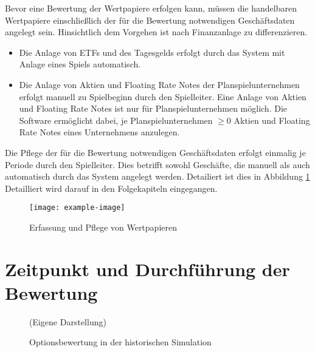 \documentclass[12pt, a4paper]{article}
\begin{document}
Bevor eine Bewertung der Wertpapiere erfolgen kann, müssen die handelbaren Wertpapiere einschließlich der für die Bewertung notwendigen Geschäftsdaten angelegt sein. Hinsichtlich dem Vorgehen ist nach Finanzanlage zu differenzieren.
\begin{itemize}
	\item Die Anlage von {ETFs} und des Tagesgelds erfolgt durch das System mit Anlage eines Spiels automatisch. 
	\item Die Anlage von Aktien und Floating Rate Notes der Planspielunternehmen erfolgt manuell zu Spielbeginn durch den Spielleiter. Eine Anlage von Aktien und Floating Rate Notes ist nur für Planspielunternehmen möglich. Die Software ermöglicht dabei, je Planspielunternehmen $\geq 0$ Aktien und Floating Rate Notes eines Unternehmens anzulegen. 
\end{itemize}
Die Pflege der für die Bewertung notwendigen Geschäftsdaten erfolgt einmalig je Periode durch den Spielleiter. Dies betrifft sowohl Geschäfte, die manuell als auch automatisch durch das System angelegt werden. Detailiert ist dies in Abbildung \ref{fig:erfassung_pflege_von_wertpapieren} Detailliert wird darauf in den Folgekapiteln eingegangen.
\begin{figure}[h]
	\centering
	\texttt{[image: example-image]}
	\caption{Erfassung und Pflege von Wertpapieren}
	\label{fig:erfassung_pflege_von_wertpapieren}
\end{figure}

\section{Zeitpunkt und Durchführung der Bewertung}
\label{sec:zeitpunkt_und_durchfuehrung_der_bewertung}


\begin{figure}[htb]
	\centering
	\caption{Optionsbewertung in der historischen Simulation}
	\label{img:zeitstrahl_var}
	(Eigene Darstellung)
\end{figure}
\end{document}
